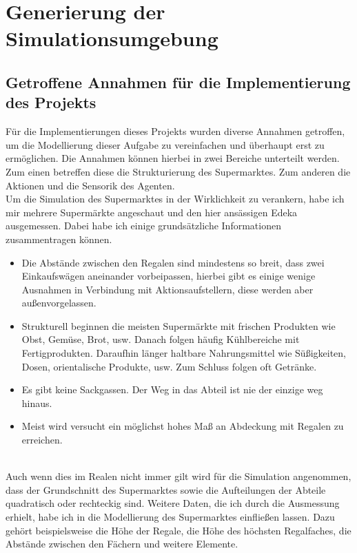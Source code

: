 \newpage
\section{Generierung der Simulationsumgebung}
\subsection{Getroffene Annahmen für die Implementierung des Projekts}
\label{annahmen}
Für die Implementierungen dieses Projekts wurden diverse Annahmen getroffen, um die Modellierung dieser Aufgabe zu vereinfachen und überhaupt erst zu ermöglichen. Die Annahmen können hierbei in zwei Bereiche unterteilt werden. Zum einen betreffen diese die Strukturierung des Supermarktes. Zum anderen die Aktionen und die Sensorik des Agenten.
\\
Um die Simulation des Supermarktes in der Wirklichkeit zu verankern, habe ich mir mehrere Supermärkte angeschaut und den hier ansässigen Edeka ausgemessen. Dabei habe ich einige grundsätzliche Informationen zusammentragen können.
\\
\begin{itemize}
	\item Die Abstände zwischen den Regalen sind mindestens so breit, dass zwei Einkaufswägen aneinander vorbeipassen, hierbei gibt es einige wenige Ausnahmen in Verbindung mit Aktionsaufstellern, diese werden aber außenvorgelassen.
	\item Strukturell beginnen die meisten Supermärkte mit frischen Produkten wie Obst, Gemüse, Brot, usw. Danach folgen häufig Kühlbereiche mit Fertigprodukten. Daraufhin länger haltbare Nahrungsmittel wie Süßigkeiten, Dosen, orientalische Produkte, usw. Zum Schluss folgen oft Getränke.
	\item Es gibt keine Sackgassen. Der Weg in das Abteil ist nie der einzige weg hinaus.
	\item Meist wird versucht ein möglichst hohes Maß an Abdeckung mit Regalen zu erreichen.
\end{itemize}
\noindent
\\
Auch wenn dies im Realen nicht immer gilt wird für die Simulation angenommen, dass der Grundschnitt des Supermarktes sowie die Aufteilungen der Abteile quadratisch oder rechteckig sind. Weitere Daten, die ich durch die Ausmessung erhielt, habe ich in die Modellierung des Supermarktes einfließen lassen. Dazu gehört beispielsweise die Höhe der Regale, die Höhe des höchsten Regalfaches, die Abstände zwischen den Fächern und weitere Elemente.
\\
